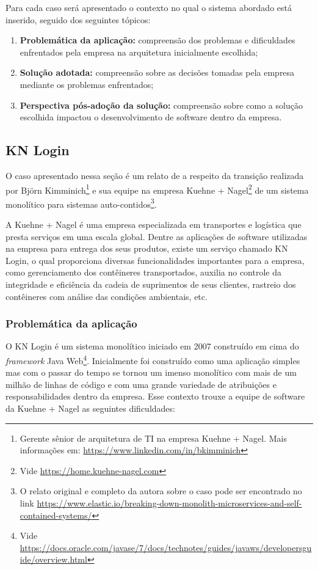 Para cada caso será apresentado o contexto no qual o sistema abordado está inserido, seguido dos
seguintes tópicos:

\begin{enumerate}
    \item \textbf{Problemática da aplicação:} compreensão dos problemas e dificuldades enfrentados
        pela empresa na arquitetura inicialmente escolhida;
    \item \textbf{Solução adotada:} compreensão sobre as decisões tomadas pela empresa mediante os
        problemas enfrentados;
    \item \textbf{Perspectiva pós-adoção da solução:} compreensão sobre como a solução escolhida
        impactou o desenvolvimento de software dentro da empresa.
\end{enumerate}

\subsection{KN Login}
\label{sec:KNLogin}

O caso apresentado nessa seção é um relato de  a respeito
da transição realizada por Björn Kimminich\footnote{Gerente sênior de arquitetura de TI na empresa
Kuehne + Nagel. Mais informações em: \url{https://www.linkedin.com/in/bkimminich}} e sua equipe na empresa
Kuehne + Nagel\footnote{Vide \url{https://home.kuehne-nagel.com}} de um sistema monolítico para sistemas
auto-contidos\footnote{O relato original e completo da autora sobre o caso pode ser encontrado no link
\url{https://www.elastic.io/breaking-down-monolith-microservices-and-self-contained-systems/}}. 

A Kuehne + Nagel é uma empresa especializada em transportes e logística que presta serviços em uma
escala global. Dentre as aplicações de software utilizadas na empresa para entrega dos seus
produtos, existe um serviço chamado KN Login, o qual proporciona diversas funcionalidades
importantes para a empresa, como gerenciamento dos contêineres transportados, auxilia no controle da
integridade e eficiência da cadeia de suprimentos de seus clientes, rastreio dos contêineres com
análise das condições ambientais, etc.

\subsubsection{Problemática da aplicação}

O KN Login é um sistema monolítico iniciado em 2007 construído em cima do \textit{framework}
Java Web\footnote{Vide \url{https://docs.oracle.com/javase/7/docs/technotes/guides/javaws/developersguide/overview.html}}.
Inicialmente foi construído como uma aplicação simples mas com o passar do tempo se tornou um imenso
monolítico com mais de um milhão de linhas de código e com uma grande variedade de atribuições e
responsabilidades dentro da empresa. Esse contexto trouxe a equipe de software da Kuehne + Nagel as
seguintes dificuldades:

